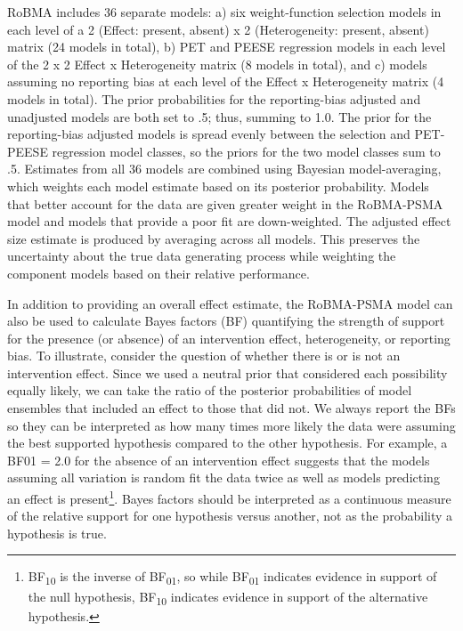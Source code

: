 \documentclass[
  doc, donotrepeattitle,floatsintext]{apa7}
\begin{document}
RoBMA includes 36 separate models: a) six weight-function selection models in each level of a 2 (Effect: present, absent) x 2 (Heterogeneity: present, absent) matrix (24 models in total), b) PET and PEESE regression models in each level of the 2 x 2 Effect x Heterogeneity matrix (8 models in total), and c) models assuming no reporting bias at each level of the Effect x Heterogeneity matrix (4 models in total). The prior probabilities for the reporting-bias adjusted and unadjusted models are both set to .5; thus, summing to 1.0. The prior for the reporting-bias adjusted models is spread evenly between the selection and PET-PEESE regression model classes, so the priors for the two model classes sum to .5. Estimates from all 36 models are combined using Bayesian model-averaging, which weights each model estimate based on its posterior probability. Models that better account for the data are given greater weight in the RoBMA-PSMA model and models that provide a poor fit are down-weighted. The adjusted effect size estimate is produced by averaging across all models. This preserves the uncertainty about the true data generating process while weighting the component models based on their relative performance.

In addition to providing an overall effect estimate, the RoBMA-PSMA model can also be used to calculate Bayes factors (BF) quantifying the strength of support for the presence (or absence) of an intervention effect, heterogeneity, or reporting bias. To illustrate, consider the question of whether there is or is not an intervention effect. Since we used a neutral prior that considered each possibility equally likely, we can take the ratio of the posterior probabilities of model ensembles that included an effect to those that did not. We always report the BFs so they can be interpreted as how many times more likely the data were assuming the best supported hypothesis compared to the other hypothesis. For example, a BF01 = 2.0 for the absence of an intervention effect suggests that the models assuming all variation is random fit the data twice as well as models predicting an effect is present\footnote{BF\textsubscript{10} is the inverse of BF\textsubscript{01}, so while BF\textsubscript{01} indicates evidence in support of the null hypothesis, BF\textsubscript{10} indicates evidence in support of the alternative hypothesis.}. Bayes factors should be interpreted as a continuous measure of the relative support for one hypothesis versus another, not as the probability a hypothesis is true.
\end{document}
